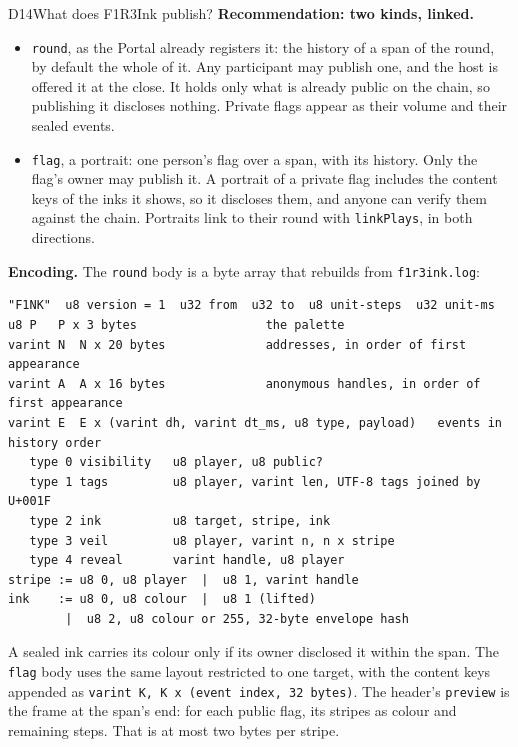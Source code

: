 \documentclass[11pt,a4paper]{article}
\newcommand{\code}[1]{\texttt{#1}}
\begin{document}
\begin{decision}{D14}{What does F1R3Ink publish?}
\textbf{Recommendation: two kinds, linked.}
\begin{itemize}[leftmargin=1.2em,itemsep=1pt]
\item \code{round}, as the Portal already registers it: the history of a span of the round, by
  default the whole of it. Any participant may publish one, and the host is offered it at the
  close. It holds only what is already public on the chain, so publishing it discloses nothing.
  Private flags appear as their volume and their sealed events.
\item \code{flag}, a portrait: one person's flag over a span, with its history. Only the flag's
  owner may publish it. A portrait of a private flag includes the content keys of the inks it
  shows, so it discloses them, and anyone can verify them against the chain. Portraits link to
  their round with \code{linkPlays}, in both directions.
\end{itemize}
\end{decision}

\textbf{Encoding.} The \code{round} body is a byte array that rebuilds from \code{f1r3ink.log}:

\begin{lstlisting}
"F1NK"  u8 version = 1  u32 from  u32 to  u8 unit-steps  u32 unit-ms
u8 P   P x 3 bytes                  the palette
varint N  N x 20 bytes              addresses, in order of first appearance
varint A  A x 16 bytes              anonymous handles, in order of first appearance
varint E  E x (varint dh, varint dt_ms, u8 type, payload)   events in history order
   type 0 visibility   u8 player, u8 public?
   type 1 tags         u8 player, varint len, UTF-8 tags joined by U+001F
   type 2 ink          u8 target, stripe, ink
   type 3 veil         u8 player, varint n, n x stripe
   type 4 reveal       varint handle, u8 player
stripe := u8 0, u8 player  |  u8 1, varint handle
ink    := u8 0, u8 colour  |  u8 1 (lifted)
        |  u8 2, u8 colour or 255, 32-byte envelope hash
\end{lstlisting}

A sealed ink carries its colour only if its owner disclosed it within the span. The
\code{flag} body uses the same layout restricted to one target, with the content keys appended
as \code{varint K, K x (event index, 32 bytes)}. The header's \code{preview} is the frame at the
span's end: for each public flag, its stripes as colour and remaining steps. That is at most two
bytes per stripe.
\end{document}
